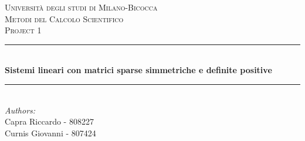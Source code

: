 \documentclass[a4paper,12pt,titlepage,oneside]{book}
\begin{document}
\begin{titlepage}

\newcommand{\HRule}{\rule{\linewidth}{0.5mm}} %

\center %
 

\textsc{\LARGE Università degli studi di Milano-Bicocca}\\[1cm] %
\textsc{\Large Metodi del Calcolo Scientifico }\\[0.3cm] %
\textsc{\large Project 1}\\[0.1cm] %


\HRule \\[0.4cm]
{ \huge \bfseries Sistemi lineari con matrici sparse simmetriche e definite positive}\\[0.4cm] %
\HRule \\[1.5cm]
 

\large
\emph{Authors:}\\
Capra Riccardo - 808227 \\ %
Curnis Giovanni - 807424 \\[1cm]





\end{titlepage}
\end{document}
